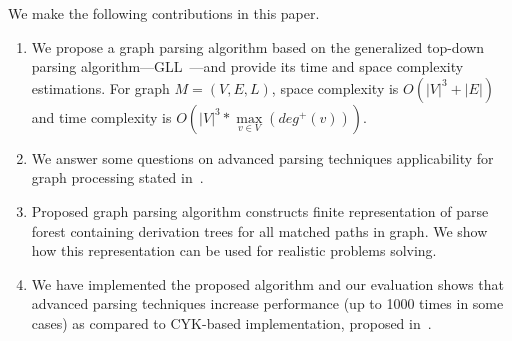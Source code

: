 \documentclass[runningheads,a4paper]{llncs}
\begin{document}
We make the following contributions in this paper.
\begin{enumerate}
\item We propose a graph parsing algorithm based on the generalized top-down parsing algorithm---GLL~\cite{scott2010gll}---and provide its time and space complexity estimations. 
For graph $M=(V,E,L)$, space complexity is $O(|V|^3 + |E|)$ and time complexity is $O\left(|V|^3*\max\limits_{v \in V}\left(deg^+\left(v\right)\right)\right)$.
\item We answer some questions on advanced parsing techniques applicability for graph processing stated in~\cite{Hellings16}.
\item Proposed graph parsing algorithm constructs finite representation of parse forest containing derivation trees for all matched paths in graph. We show how this representation can be used for realistic problems solving.
\item We have implemented the proposed algorithm and our evaluation shows that advanced parsing techniques increase performance (up to 1000 times in some cases) as compared to CYK-based implementation, proposed in~\cite{CFGonRDF}.
\end{enumerate}











\end{document}
